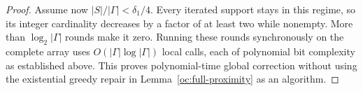 \begin{proof}
Assume now $|S|/|\Gamma|<\delta_1/4$.  Every iterated support stays
in this regime, so its integer cardinality decreases by a factor of
at least two while nonempty.  More than $\log_2|\Gamma|$ rounds make
it zero.  Running these rounds synchronously on the complete array
uses $O(|\Gamma|\log|\Gamma|)$ local calls, each of polynomial
bit complexity as established above.  This proves polynomial-time
global correction without using the existential greedy repair in
Lemma~\ref{oc:full-proximity} as an algorithm.
\end{proof}
